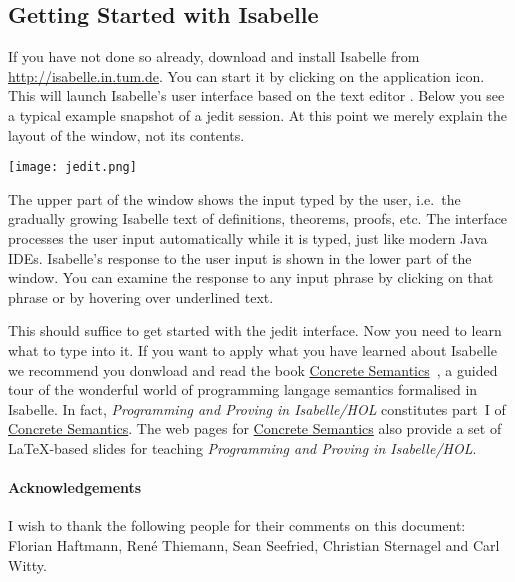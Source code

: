 \ifsem
\subsection*{Getting Started with Isabelle}

If you have not done so already, download and install Isabelle
from \url{http://isabelle.in.tum.de}. You can start it by clicking
on the application icon. This will launch Isabelle's
user interface based on the text editor . Below you see
a typical example snapshot of a jedit session. At this point we merely explain
the layout of the window, not its contents.

\begin{center}
\texttt{[image: jedit.png]}
\end{center}
The upper part of the window shows the input typed by the user, i.e.\ the
gradually growing Isabelle text of definitions, theorems, proofs, etc.  The
interface processes the user input automatically while it is typed, just like
modern Java IDEs.  Isabelle's response to the user input is shown in the
lower part of the window. You can examine the response to any input phrase
by clicking on that phrase or by hovering over underlined text.

This should suffice to get started with the jedit interface.
Now you need to learn what to type into it.
\else
If you want to apply what you have learned about Isabelle we recommend you
donwload and read the book
\href{http://www.in.tum.de/~nipkow/Concrete/}{Concrete
Semantics}~\cite{ConcreteSemantics}, a guided tour of the wonderful world of
programming langage semantics formalised in Isabelle.  In fact,
\emph{Programming and Proving in Isabelle/HOL} constitutes part~I of
\href{http://www.in.tum.de/~nipkow/Concrete/}{Concrete Semantics}.  The web
pages for \href{http://www.in.tum.de/~nipkow/Concrete/}{Concrete Semantics}
also provide a set of \LaTeX-based slides for teaching \emph{Programming and
Proving in Isabelle/HOL}.
\fi

\ifsem\else
\paragraph{Acknowledgements}
I wish to thank the following people for their comments on this document:
Florian Haftmann, Ren\'{e} Thiemann, Sean Seefried, Christian Sternagel
and Carl Witty.
\fi